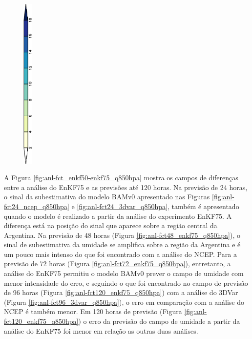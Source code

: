 \begin{figure}[H]
\begin{center}
        \includegraphics[width=0.04\textwidth,angle=-90]{./figs/cap5/estudo_zcas/cbar/cbar_anls-crop.pdf}
    \end{center}
    \vspace{2mm}
    \label{fig:anl-fct_ncep-3dvar_q850hpa}
\end{figure}

A Figura \ref{fig:anl-fct_enkf50-enkf75_q850hpa} mostra os campos de diferenças entre a análise do EnKF75 e as previsões até 120 horas. Na previsão de 24 horas, o sinal da subestimativa do modelo BAMv0 apresentado nas Figuras \ref{fig:anl-fct24_ncep_q850hpa} e \ref{fig:anl-fct24_3dvar_q850hpa}, também é apresentado quando o modelo é realizado a partir da análise do experimento EnKF75. A diferença está na posição do sinal que aparece sobre a região central da Argentina. Na previsão de 48 horas (Figura \ref{fig:anl-fct48_enkf75_q850hpa}), o sinal de subestimativa da umidade se amplifica sobre a região da Argentina e é um pouco mais intenso do que foi encontrado com a análise do NCEP. Para a previsão de 72 horas (Figura \ref{fig:anl-fct72_enkf75_q850hpa}), entretanto, a análise do EnKF75 permitiu o modelo BAMv0 prever o campo de umidade com menor intensidade do erro, e seguindo o que foi encontrado no campo de previsão de 96 horas (Figura \ref{fig:anl-fct120_enkf75_q850hpa}) com a análise do 3DVar (Figura \ref{fig:anl-fct96_3dvar_q850hpa}), o erro em comparação com a análise do NCEP é também menor. Em 120 horas de previsão (Figura \ref{fig:anl-fct120_enkf75_q850hpa}) o erro da previsão do campo de umidade a partir da análise do EnKF75 foi menor em relação as outras duas análises.

